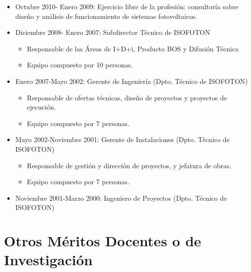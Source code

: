 \documentclass[article, a4paper]{memoir}
\begin{document}
\begin{itemize}
\item Octubre 2010- Enero 2009: Ejercicio libre de la profesión: consultoría sobre diseño y análisis de funcionamiento de sistemas fotovoltaicos.

\item Diciembre 2008- Enero 2007: Subdirector Técnico de ISOFOTON

\begin{itemize}
\item Responsable de las Áreas de I+D+i, Producto BOS y Difusión Técnica
\item Equipo compuesto por 10 personas.
\end{itemize}
\end{itemize}


\begin{itemize}
\item Enero 2007-Mayo 2002: Gerente de Ingeniería (Dpto. Técnico de ISOFOTON)

\begin{itemize}
\item Responsable de ofertas técnicas, diseño de proyectos y proyectos de ejecución.
\item Equipo compuesto por 7 personas.
\end{itemize}
\end{itemize}


\begin{itemize}
\item Mayo 2002-Noviembre 2001: Gerente de Instalaciones (Dpto. Técnico de ISOFOTON)

\begin{itemize}
\item Responsable de gestión y dirección de proyectos, y jefatura de obras.
\item Equipo compuesto por 7 personas.
\end{itemize}
\end{itemize}


\begin{itemize}
\item Noviembre 2001-Marzo 2000: Ingeniero de Proyectos (Dpto. Técnico de ISOFOTON)
\end{itemize}



\section{Otros Méritos Docentes o de Investigación}
\label{sec-12}
\end{document}
